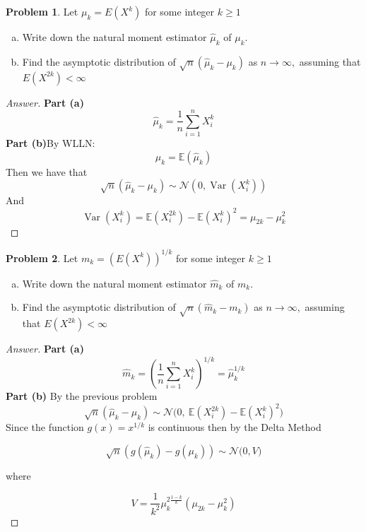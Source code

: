 \documentclass{article}
\theoremstyle{definition}
\newtheorem{problem}{Problem}
\begin{document}
\begin{problem}
Let $\mu_{k}=E\left(X^{k}\right)$ for some integer $k \geq 1$
\begin{enumerate}[(a)]
    \item Write down the natural moment estimator $\hat{\mu}_{k}$ of $\mu_{k}$.
    \item Find the asymptotic distribution of $\sqrt{n}\left(\hat{\mu}_{k}-\mu_{k}\right)$ as $n \rightarrow \infty,$ assuming that $E\left(X^{2 k}\right)<\infty$
\end{enumerate}
\end{problem}
\begin{proof}[Answer]
\textbf{Part (a)}
$$\hat{\mu}_k = \frac{1}{n}\sum_{i=1}^n X_i^k$$
\textbf{Part (b)}By WLLN:
$$\mu_k = \mathbb{E}(\widehat{\mu}_k)$$
Then we have that
$$\sqrt{n}(\widehat{\mu}_k - \mu_k) \sim \mathcal{N}(0,\operatorname{Var}(X_i^k))$$
And
$$\operatorname{Var}(X_i^k) = \mathbb{E}(X_i^{2k}) - \mathbb{E}(X_i^{k})^2 = \mu_{2k}-\mu_{k}^2$$ 

\end{proof}
\begin{problem}
Let $m_{k}=\left(E\left(X^{k}\right)\right)^{1 / k}$ for some integer $k \geq 1$
\begin{enumerate}[(a)]
    \item Write down the natural moment estimator $\hat{m}_{k}$ of $m_{k}$.
    \item Find the asymptotic distribution of $\sqrt{n}\left(\hat{m}_{k}-m_{k}\right)$ as $n \rightarrow \infty,$ assuming that $E\left(X^{2 k}\right)<\infty$
\end{enumerate}
\end{problem}
\begin{proof}[Answer]
\textbf{Part (a)}
$$\hat{m}_k = \left(\frac{1}{n} \sum_{i=1}^nX_i^k\right)^{1/k} = \widehat{\mu}_k^{1/k}$$
\textbf{Part (b)}
By the previous problem
$$\sqrt{n}(\widehat{\mu}_k - \mu_k) \sim \mathcal{N}\big(0,\:\mathbb{E}(X_i^{2k}) - \mathbb{E}(X_i^{k})^2 \big)$$
Since the function $g(x)=x^{1/k}$ is continuous then by the Delta Method 

$$\sqrt{n}(g(\widehat{\mu}_k)- g(\mu_k)) \sim \mathcal{N}\big(0,V\big)$$

where

$$V =\frac{1}{k^{2}} \mu_{k}^{2 \frac{1-k}{k}}\left(\mu_{2 k}-\mu_{k}^{2}\right)$$

\end{proof}
\end{document}
